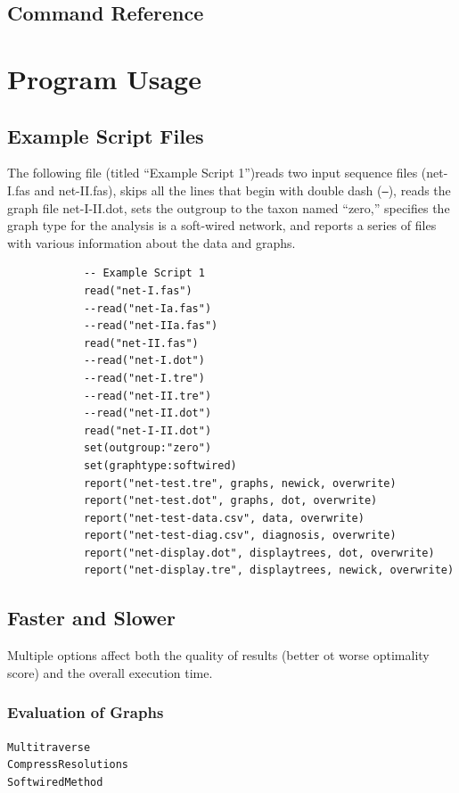 \documentclass[11pt]{book}
\begin{document}
{%

\section{Command Reference}
	

\chapter{Program Usage}
\section{Example Script Files}
	The following file (titled ``Example Script 1'')reads two input sequence files (net-I.fas and net-II.fas), 
	skips all 	the lines that begin with double dash (\texttt{--}), reads the graph file net-I-II.dot, sets the 
	outgroup to the taxon named ``zero,'' specifies the graph type for the analysis is a soft-wired network, 
	and 	reports a series of files with various information about the data and graphs.
	
		\begin{verbatim}
			-- Example Script 1
			read("net-I.fas")
			--read("net-Ia.fas")
			--read("net-IIa.fas")
			read("net-II.fas")
			--read("net-I.dot")
			--read("net-I.tre")
			--read("net-II.tre")
			--read("net-II.dot")
			read("net-I-II.dot")
			set(outgroup:"zero")
			set(graphtype:softwired)
			report("net-test.tre", graphs, newick, overwrite)
			report("net-test.dot", graphs, dot, overwrite)
			report("net-test-data.csv", data, overwrite)
			report("net-test-diag.csv", diagnosis, overwrite)
			report("net-display.dot", displaytrees, dot, overwrite)
			report("net-display.tre", displaytrees, newick, overwrite)
		\end{verbatim}
	
\section{Faster and Slower}
Multiple options affect both the quality of results (better ot worse optimality score) and
the overall execution time.

\subsection{Evaluation of Graphs}
	\texttt{Multitraverse}\\
	\texttt{CompressResolutions}\\
	\texttt{SoftwiredMethod}\\

}
\end{document}
